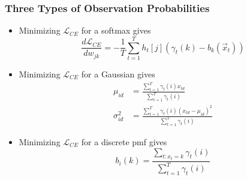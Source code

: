 \documentclass{beamer}
\begin{document}
\begin{frame}
  \frametitle{Three Types of Observation Probabilities}
  \begin{itemize}
  \item Minimizing ${\mathcal L}_{CE}$ for a softmax gives
    \begin{displaymath}
      \frac{d{\mathcal L}_{CE}}{dw_{jk}}=
      -\frac{1}{T}\sum_{t=1}^T h_{t}[j]\left(\gamma_t(k)-b_k(\vec{x}_t)\right)
    \end{displaymath}
  \item Minimizing ${\mathcal L}_{CE}$ for a Gaussian gives
    \begin{align*}
      \mu_{id} &= \frac{\sum_{t=1}^T\gamma_t(i)x_{td}}{\sum_{t=1}^T\gamma_t(i)}\\
      \sigma_{id}^2 &= \frac{\sum_{t=1}^T\gamma_t(i)(x_{td}-\mu_{id})^2}{\sum_{t=1}^T\gamma_t(i)}
    \end{align*}
  \item Minimizing ${\mathcal L}_{CE}$ for a discrete pmf gives
    \begin{displaymath}
      b_i(k)=\frac{\sum_{t:x_t=k}\gamma_t(i)}{\sum_{t=1}^T \gamma_t(i)}
    \end{displaymath}
  \end{itemize}
\end{frame}
\end{document}
